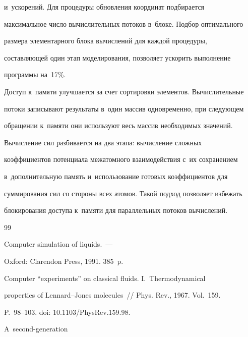 {и~ускорений. Для процедуры обновления координат подбирается 

максимальное число вычислительных потоков в~блоке. Подбор оптимального 

размера элементарного блока вычислений для каждой процедуры, 

составляющей один этап моделирования, позволяет ускорить выполнение 

программы на~17\%. 

  

  Доступ к~памяти улучшается за счет сортировки элементов. Вычислительные 

потоки записывают результаты в~один массив одновременно, при следующем 

обращении к~памяти они используют весь массив необходимых значений. 

  

  Вычисление сил разбивается на два этапа: вычисление сложных 

коэффициентов потенциала межатомного взаимодействия с~их сохранением 

в~дополнительную память и~использование готовых коэффициентов для 

суммирования сил со стороны всех атомов. Такой подход позволяет избежать 

блокирования доступа к~памяти для параллельных потоков вычислений.

  

{\small\frenchspacing

{%


\begin{thebibliography}{99}


 Computer simulation of liquids.~--- 

Oxford: Clarendon Press, 1991. 385~p.


 Computer ``experiments'' on classical fluids. I.~Thermodynamical 

properties of Lennard--Jones molecules~/\!\!/ Phys. Rev., 1967. Vol.~159.  

P.~98--103. doi: 10.1103\!/\linebreak PhysRev.159.98.


 A~second-generation 


\end{thebibliography}}}}
